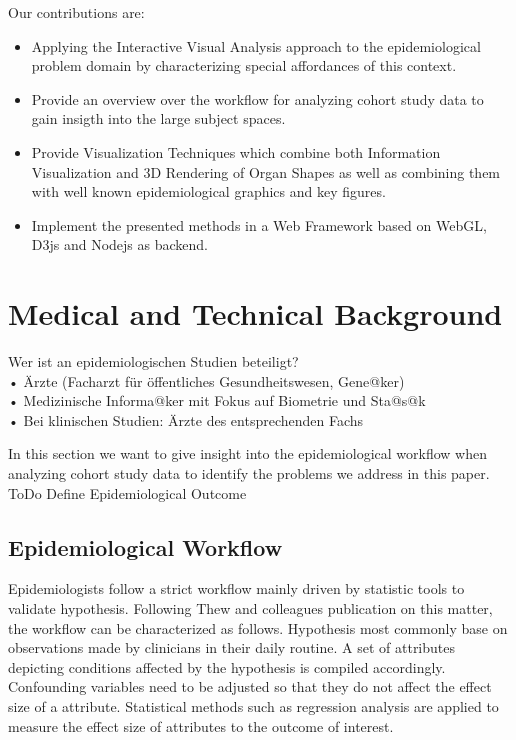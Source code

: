 \documentclass[journal]{style/vgtc}           %
\begin{document}
Our contributions are:
\begin{itemize}
	\item Applying the Interactive Visual Analysis approach to the epidemiological problem domain by characterizing special affordances of this context.
	\item Provide an overview over the workflow for analyzing cohort study data to gain insigth into the large subject spaces.
	\item Provide Visualization Techniques which combine both Information Visualization and 3D Rendering of Organ Shapes as well as combining them with well known epidemiological graphics and key figures.
	\item Implement the presented methods in a Web Framework based on WebGL, D3js and Nodejs as backend.
\end{itemize}



\section{Medical and Technical Background}
Wer ist an epidemiologischen Studien beteiligt?\\
•  Ärzte (Facharzt für öffentliches Gesundheitswesen, Gene@ker)\\
•  Medizinische Informa@ker mit Fokus auf Biometrie und Sta@s@k\\
•  Bei klinischen Studien: Ärzte des entsprechenden Fachs

In this section we want to give insight into the epidemiological workflow when analyzing cohort study data to identify the problems we address in this paper.
%
ToDo Define Epidemiological Outcome
%
\subsection{Epidemiological Workflow}
Epidemiologists follow a strict workflow mainly driven by statistic tools to validate hypothesis.
%
Following Thew and colleagues publication on this matter, the workflow can be characterized as follows.
%
Hypothesis most commonly base on observations made by clinicians in their daily routine.
%
A set of attributes depicting conditions affected by the hypothesis is compiled accordingly.
%
Confounding variables need to be adjusted so that they do not affect the effect size of a attribute.
%
Statistical methods such as regression analysis are applied to measure the effect size of attributes to the outcome of interest.
%
\end{document}
